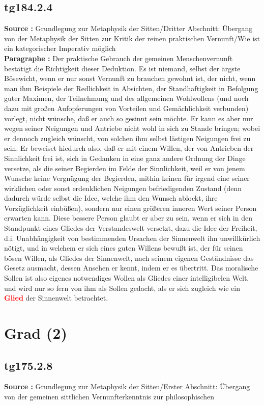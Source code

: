 \documentclass[a4paper,12pt,twoside]{book}
\newcommand{\match}[1]{\textcolor{red}{\textbf{#1}}}
\newcommand{\unnumberedsection}[1]{
	\section*{#1}
	\addcontentsline{toc}{section}{#1}
	\markright{#1}
}
\begin{document}
	\subsection*{tg184.2.4} 
	\textbf{Source : }Grundlegung zur Metaphysik der Sitten/Dritter Abschnitt: Übergang von der Metaphysik der Sitten zur Kritik der reinen praktischen Vernunft/Wie ist ein kategorischer Imperativ möglich\\  
	
	\noindent\textbf{Paragraphe : }Der praktische Gebrauch der gemeinen Menschenvernunft bestätigt die Richtigkeit dieser Deduktion. Es ist niemand, selbst der ärgste Bösewicht, wenn er nur sonst Vernunft  zu brauchen gewohnt ist, der nicht, wenn man ihm Beispiele der Redlichkeit in Absichten, der Standhaftigkeit in Befolgung guter Maximen, der Teilnehmung und des allgemeinen Wohlwollens (und noch dazu mit großen Aufopferungen von Vorteilen und Gemächlichkeit verbunden) vorlegt, nicht wünsche, daß er auch so gesinnt sein möchte. Er kann es aber nur wegen seiner Neigungen und Antriebe nicht wohl in sich zu Stande bringen; wobei er dennoch zugleich wünscht, von solchen ihm selbst lästigen Neigungen frei zu sein. Er beweiset hiedurch also, daß er mit einem Willen, der von Antrieben der Sinnlichkeit frei ist, sich in Gedanken in eine ganz andere Ordnung der Dinge versetze, als die seiner Begierden im Felde der Sinnlichkeit, weil er von jenem Wunsche keine Vergnügung der Begierden, mithin keinen für irgend eine seiner wirklichen oder sonst erdenklichen Neigungen befriedigenden Zustand (denn dadurch würde selbst die Idee, welche ihm den Wunsch ablockt, ihre Vorzüglichkeit einbüßen), sondern nur einen größeren inneren Wert seiner Person erwarten kann. Diese bessere Person glaubt er aber zu sein, wenn er sich in den Standpunkt eines Gliedes der Verstandeswelt versetzt, dazu die Idee der Freiheit, d.i. Unabhängigkeit von bestimmenden Ursachen der Sinnenwelt ihn unwillkürlich nötigt, und in welchem er sich eines guten Willens bewußt ist, der für seinen bösen Willen, als Gliedes der Sinnenwelt, nach seinem eigenen Geständnisse das Gesetz ausmacht, dessen Ansehen er kennt, indem er es übertritt. Das moralische Sollen ist also eigenes notwendiges Wollen als Gliedes einer intelligibelen Welt, und wird nur so fern von ihm als Sollen gedacht, als er sich zugleich wie ein \match{Glied} der Sinnenwelt betrachtet. 
	
	\unnumberedsection{Grad (2)} 
	\subsection*{tg175.2.8} 
	\textbf{Source : }Grundlegung zur Metaphysik der Sitten/Erster Abschnitt: Übergang von der gemeinen sittlichen Vernunfterkenntnis zur philosophischen\\  
	
\end{document}

